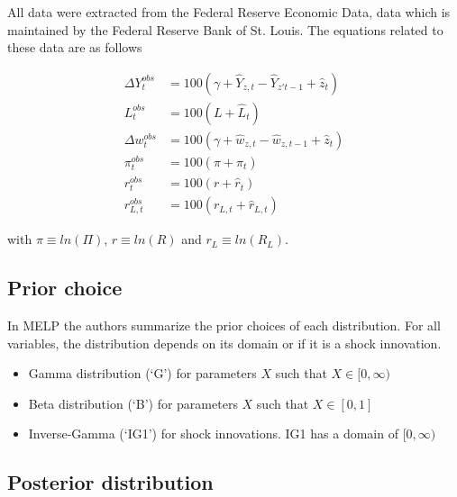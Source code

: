 \documentclass[notitlepage,12pt]{report}
\begin{document}
\begin{appendices}
	All data were extracted from the Federal Reserve Economic Data, data which is maintained by the Federal Reserve Bank of St. Louis. The equations related to these data are as follows
	
	\begin{align}
	\Delta Y_t^{obs}&=100(\gamma+\hat{Y}_{z,t}-\hat{Y}_{z't-1}+\hat{z}_t)\\
	L_t^{obs}&=100\left(L+\hat{L}_t\right)\\
	\Delta w_t^{obs}&=100(\gamma+\hat{w}_{z,t}-\hat{w}_{z,t-1}+\hat{z}_t)\\
	\pi_t^{obs}&=100(\pi+\hat{\pi}_t)\\
	r_t^{obs}&=100(r+\hat{r}_t)\\
	r_{L,t}^{obs}&=100(r_{L,t}+\hat{r}_{L,t})
	\end{align}
	
	with \(\pi\equiv ln(\Pi)\), \(r\equiv ln(R)\) and \(r_L\equiv ln(R_L)\).
	
	\subsection{Prior choice}
	
	In MELP the authors summarize the prior choices of each distribution.\cite[Tables 2-3]{chen_macroeconomic_2011} For all variables, the distribution depends on its domain or if it is a shock innovation.
	
	\begin{itemize}[noitemsep]
		\item Gamma distribution (`G') for parameters \(X\) such that \(X\in[0,\infty)\)
		\item Beta distribution (`B') for parameters \(X\) such that \(X\in[0,1]\)
		\item Inverse-Gamma (`IG1') for shock innovations. IG1 has a domain of \([0,\infty)\)
	\end{itemize}
	
	\subsection{Posterior distribution}
	

\end{appendices}
\end{document}
